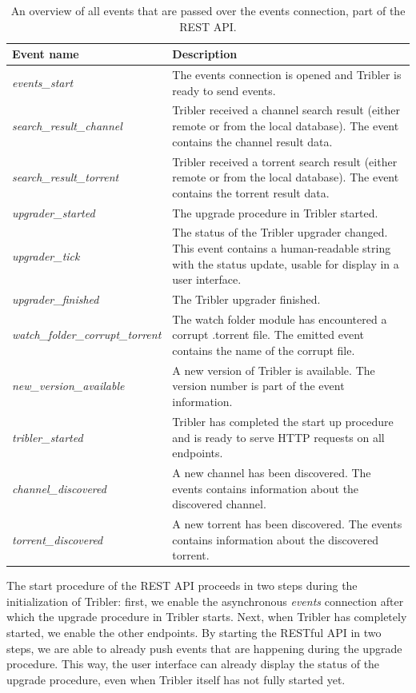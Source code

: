 \begin{table}
	\begin{tabularx}{\textwidth}{|l|X|}
		\hline
		\textbf{Event name} & \textbf{Description} \\ \hline
		\emph{events\_start} & The events connection is opened and Tribler is ready to send events.  \\ \hline
		\emph{search\_result\_channel} & Tribler received a channel search result (either remote or from the local database). The event contains the channel result data. \\ \hline
		\emph{search\_result\_torrent} & Tribler received a torrent search result (either remote or from the local database). The event contains the torrent result data. \\ \hline
		\emph{upgrader\_started} & The upgrade procedure in Tribler started. \\ \hline
		\emph{upgrader\_tick} & The status of the Tribler upgrader changed. This event contains a human-readable string with the status update, usable for display in a user interface. \\ \hline
		\emph{upgrader\_finished} & The Tribler upgrader finished. \\ \hline
		\emph{watch\_folder\_corrupt\_torrent} & The watch folder module has encountered a corrupt .torrent file. The emitted event contains the name of the corrupt file.\\ \hline
		\emph{new\_version\_available} & A new version of Tribler is available. The version number is part of the event information.\\ \hline
		\emph{tribler\_started} & Tribler has completed the start up procedure and is ready to serve HTTP requests on all endpoints.\\ \hline
		\emph{channel\_discovered} & A new channel has been discovered. The events contains information about the discovered channel.\\ \hline
		\emph{torrent\_discovered} & A new torrent has been discovered. The events contains information about the discovered torrent.\\ \hline
	\end{tabularx}
	\caption{An overview of all events that are passed over the events connection, part of the REST API.}
	\label{table:rest-api-events}
\end{table}

\noindent The start procedure of the REST API proceeds in two steps during the initialization of Tribler: first, we enable the asynchronous \emph{events} connection after which the upgrade procedure in Tribler starts. Next, when Tribler has completely started, we enable the other endpoints. By starting the RESTful API in two steps, we are able to already push events that are happening during the upgrade procedure. This way, the user interface can already display the status of the upgrade procedure, even when Tribler itself has not fully started yet.

